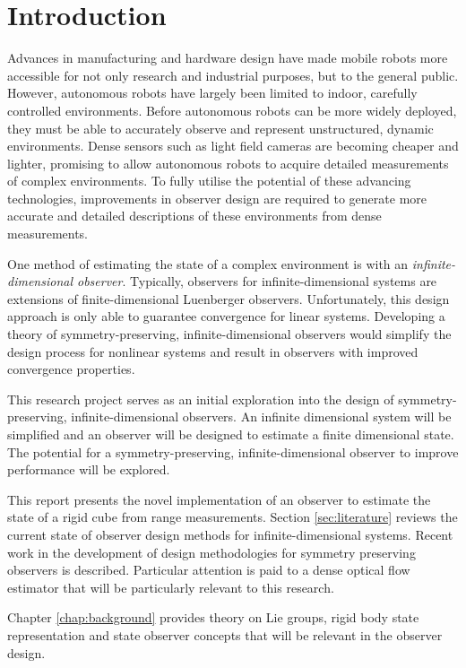 \chapter{Introduction}

Advances in manufacturing and hardware design have made mobile robots more accessible for not only research and industrial purposes, but to the general public. However, autonomous robots have largely been limited to indoor, carefully controlled environments. Before autonomous robots can be more widely deployed, they must be able to accurately observe and represent unstructured, dynamic environments. Dense sensors such as light field cameras are becoming cheaper and lighter, promising to allow autonomous robots to acquire detailed measurements of complex environments. To fully utilise the potential of these advancing technologies, improvements in observer design are required to generate more accurate and detailed descriptions of these environments from dense measurements.

One method of estimating the state of a complex environment is with an \textit{infinite-dimensional observer}. Typically, observers for infinite-dimensional systems are extensions of finite-dimensional Luenberger observers. Unfortunately, this design approach is only able to guarantee convergence for linear systems. Developing a theory of symmetry-preserving, infinite-dimensional observers would simplify the design process for nonlinear systems and result in observers with improved convergence properties.

This research project serves as an initial exploration into the design of symmetry-preserving, infinite-dimensional observers. An infinite dimensional system will be simplified and an observer will be designed to estimate a finite dimensional state. The potential for a symmetry-preserving, infinite-dimensional observer to improve performance will be explored. 

This report presents the novel implementation of an observer to estimate the state of a rigid cube from range measurements. Section \ref{sec:literature} reviews the current state of observer design methods for infinite-dimensional systems. Recent work in the development of design methodologies for symmetry preserving observers is described. Particular attention is paid to a dense optical flow estimator that will be particularly relevant to this research.
 
Chapter \ref{chap:background} provides theory on Lie groups, rigid body state representation and state observer concepts that will be relevant in the observer design.

